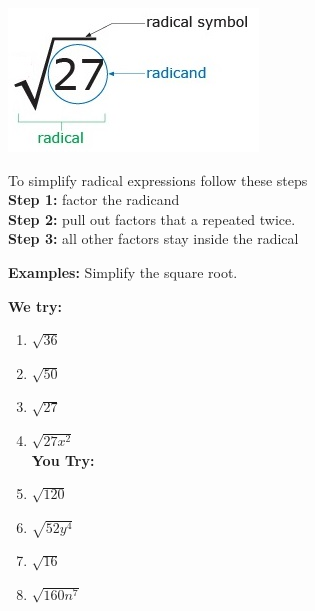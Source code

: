 \documentclass[12pt]{article}
\begin{document}
\begin{center}
\includegraphics[scale=.7]{squareroot.jpg}\\
\end{center}

To simplify radical expressions follow these steps\\

\textbf{Step 1:} factor the radicand\\

\textbf{Step 2:} pull out factors that a repeated twice.\\

\textbf{Step 3:} all other factors stay inside the radical\\

\hrulefill

\textbf{Examples:} Simplify the square root.\\

\begin{multicols}{2}
\textbf{We try:}\\

\begin{enumerate}
	\setlength\itemsep{1cm}

	\item $\sqrt{36}$\\
	
	
	\item $\sqrt{50}$\\
	
	
	\item $\sqrt{27}$\\
	
	
	\item $\sqrt{27x^2}$\\
	
		
\textbf{You Try:}\\
	
	\item  $\sqrt{120}$ \\
	
	
	\item $\sqrt{52y^4}$\\
	
	
	\item $\sqrt{16}$\\
	
	
	\item $\sqrt{160n^7}$\\
	
	

\end{enumerate}
\end{multicols}
\end{document}
